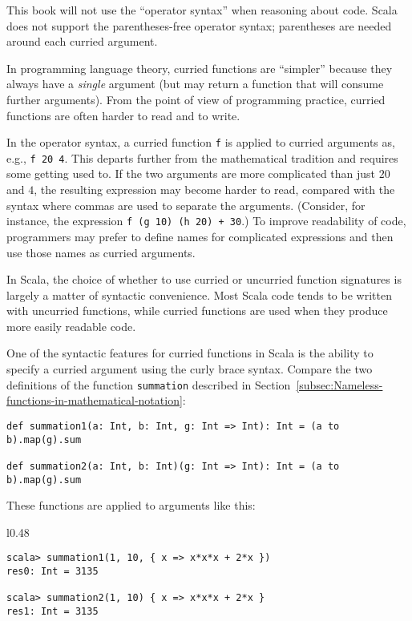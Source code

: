 This book will not use the \textsf{``}operator syntax\textsf{''} when reasoning about
code. Scala does not support the parentheses-free operator syntax;
parentheses are needed around each curried argument.

In programming language theory, curried functions are \textsf{``}simpler\textsf{''}
because they always have a \emph{single} argument (but may return
a function that will consume further arguments). From the point of
view of programming practice, curried functions are often harder to
read and to write.

In the operator syntax, a curried function \lstinline!f! is applied
to curried arguments as, e.g., \lstinline!f 20 4!. This departs further
from the mathematical tradition and requires some getting used to.
If the two arguments are more complicated than just $20$ and $4$,
the resulting expression may become harder to read, compared with
the syntax where commas are used to separate the arguments. (Consider,
for instance, the expression \lstinline!f (g 10) (h 20) + 30!.) To
improve readability of code, programmers may prefer to define names
for complicated expressions and then use those names as curried arguments.

In Scala, the choice of whether to use curried or uncurried function
signatures is largely a matter of syntactic convenience. Most Scala
code tends to be written with uncurried functions, while curried functions
are used when they produce more easily readable code.

One of the syntactic features for curried functions in Scala is the
ability to specify a curried argument using the curly brace syntax.
Compare the two definitions of the function \lstinline!summation!
described in Section~\ref{subsec:Nameless-functions-in-mathematical-notation}:
\begin{lstlisting}
def summation1(a: Int, b: Int, g: Int => Int): Int = (a to b).map(g).sum

def summation2(a: Int, b: Int)(g: Int => Int): Int = (a to b).map(g).sum
\end{lstlisting}
These functions are applied to arguments like this:

\begin{wrapfigure}{l}{0.48\columnwidth}%
\vspace{-0.5\baselineskip}
\begin{lstlisting}
scala> summation1(1, 10, { x => x*x*x + 2*x })
res0: Int = 3135

scala> summation2(1, 10) { x => x*x*x + 2*x }
res1: Int = 3135
\end{lstlisting}
\vspace{-0.75\baselineskip}
\end{wrapfigure}%


